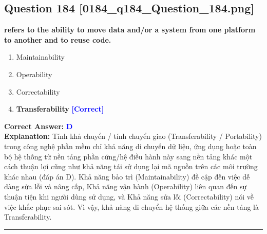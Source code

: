 \documentclass[11pt,a4paper]{article}
\begin{document}
\begin{minipage}{\textwidth}
\subsection*{Question 184 \quad \footnotesize{[0184\_q184\_Question\_184.png]}}
\noindent \textbf{refers to the ability to move data and/or a system from one platform to another and to reuse code.}

\begin{enumerate}[label=\Alph*.]
    \item Maintainability
    \item Operability
    \item Correctability
    \item \textbf{Transferability} \hfill \textcolor{blue}{\textbf{[Correct]}}
\end{enumerate}

\noindent \textbf{Correct Answer:} \textcolor{blue}{\textbf{D}} \\[2pt]
\noindent \textbf{Explanation:} Tính khả chuyển / tính chuyển giao (Transferability / Portability) trong công nghệ phần mềm chỉ khả năng di chuyển dữ liệu, ứng dụng hoặc toàn bộ hệ thống từ nền tảng phần cứng/hệ điều hành này sang nền tảng khác một cách thuận lợi cũng như khả năng tái sử dụng lại mã nguồn trên các môi trường khác nhau (đáp án D). Khả năng bảo trì (Maintainability) đề cập đến việc dễ dàng sửa lỗi và nâng cấp, Khả năng vận hành (Operability) liên quan đến sự thuận tiện khi người dùng sử dụng, và Khả năng sửa lỗi (Correctability) nói về việc khắc phục sai sót. Vì vậy, khả năng di chuyển hệ thống giữa các nền tảng là Transferability.

\par\vspace{0.3cm}
\hrule
\vspace{0.3cm}
\end{minipage}
\end{document}
